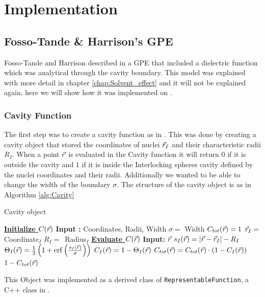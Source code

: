 \documentclass[../master_thesis.tex]{subfiles}
\begin{document}
\chapter{Implementation}\label{chap:implementation}
\section{Fosso-Tande \& Harrison's \ac{GPE}}
Fosso-Tande and Harrison described in \cite{FossoTande:2013ka} a \ac{GPE} that
included a dielectric function which was analytical through the cavity boundary.
This model was explained with more detail in chapter \ref{chap:Solvent_effect} and
it will not be explained again, here we will show how it was implemented on
\mrchem.
\subsection{Cavity Function}
The first step was to create a cavity function as in \cite{FossoTande:2013ka}.
This was done by creating a cavity object that stored the coordinates of nuclei
$\vec{r}_I$ and their characteristic radii $R_I$. When a point $\vec{r}$ is evaluated
in the Cavity function it will return $0$ if it is outside the cavity and $1$ if
it is inside the Interlocking spheres cavity defined by the nuclei coordinates
and their radii. Additionally we wanted to be able to change the width of the
boundary $\sigma$. The structure of the cavity object is as in Algorithm \ref{alg:Cavity}

\begin{algorithm}
  \caption{Cavity object}\label{alg:Cavity}
  \begin{algorithmic}
    \STATE \underline{\textbf{Initialize $C(\vec{r})$}}
    \STATE \textbf{Input :} Coordinates, Radii, Width
    \STATE $\sigma = $ Width
    \STATE $C_{tot}(\vec{r}) = 1$
     \STATE $\vec{r}_I = $ Coordinate$_I$
     \STATE $R_I = $ Radius$_I$
    \ENDFOR
    \STATE
    \STATE \underline{\textbf{Evaluate $C(\vec{r})$}}
    \STATE \textbf{Input: } $\vec{r}$
      \STATE $s_I(\vec{r}) = \abs{\vec{r} - \vec{r}_I} - R_I$
      \STATE $\Theta_I(\rvec) = \frac{1}{2}\left(1 + \erf\left(\frac{s_I(\rvec)}{\sigma}\right)\right)$
      \STATE $ C_I(\vec{r}) = 1 -\Theta_I(\vec{r}) $
      \STATE $ C_{tot}(\vec{r}) = C_{tot}(\vec{r}) \cdot (1 - C_{I}(\vec{r}))$
    \ENDFOR
    \RETURN $ 1 - C_{tot}(\vec{r})$
  \end{algorithmic}
\end{algorithm}
This Object was implemented as a derived class of \verb!RepresentableFunction!,
a C++ class in \mrchem.
\end{document}

